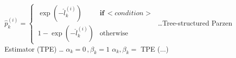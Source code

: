 \documentclass[final,1p,times,authoryear]{elsarticle}
\newenvironment{SgAlgorithm}[1][t]
{%
	\begin{algorithm2e}[#1]
    \linespread{1.5}
    \selectfont
}
{\end{algorithm2e}}
\begin{document}
\begin{SgAlgorithm}
{{            $\widehat{p}_k^{(i)} =
                \begin{cases}
                    \, \exp(-\widehat{l}_k^{(i)})  & \textbf{if} \, <condition>
                    \\
                    \, 1 - \exp(-\widehat{l}_k^{(i)}) & \text{otherwise}
                \end{cases}$
        }
    }
    \BlankLine%
    {%
        \dots Tree-structured Parzen Estimator (TPE) \dots \;
    }
    \Fn{}
    {
        {%
            $ \alpha_k = 0 \, , \beta_k = 1$ \;
            {%
                $ \alpha_k, \beta_k =$ TPE ($\dots$)
            }
        }
    }
    \BlankLine%
\end{SgAlgorithm}
\end{document}
